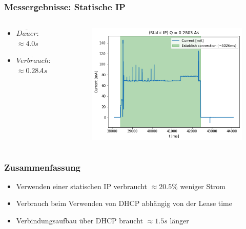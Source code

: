 \begin{frame}
    \frametitle{Messergebnisse: Statische IP}
    \begin{columns}
        \begin{column}{0.35\textwidth}
            \begin{itemize}
                \item $\overline{Dauer}$: $\approx4.0s$
                \item $\overline{Verbrauch}$: $\approx0.28As$
            \end{itemize}
        \end{column}
        \begin{column}{0.65\textwidth}
            \begin{figure}
                \includegraphics[scale=0.5]{../paper/fig/static_ip.png}
            \end{figure}
        \end{column}
    \end{columns}
\end{frame}

\begin{frame}
    \frametitle{Zusammenfassung}

    \begin{itemize}
        \item Verwenden einer statischen IP verbraucht $\approx 20.5\%$ weniger Strom
        \item Verbrauch beim Verwenden von DHCP abhängig von der Lease time
        \item Verbindungsaufbau über DHCP braucht $\approx 1.5s$ länger
    \end{itemize}


\end{frame}

